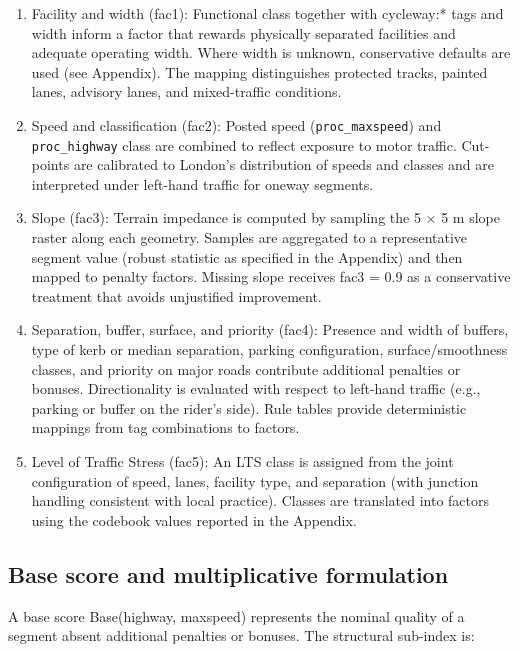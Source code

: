 \documentclass[
  12pt,
  oneside]{book}
\begin{document}
\begin{enumerate}
\def\labelenumi{\arabic{enumi}.}
\item
  Facility and width (fac1): Functional class together with cycleway:* tags and width inform a factor that rewards physically separated facilities and adequate operating width. Where width is unknown, conservative defaults are used (see Appendix). The mapping distinguishes protected tracks, painted lanes, advisory lanes, and mixed-traffic conditions.
\item
  Speed and classification (fac2): Posted speed (\texttt{proc\_maxspeed}) and \texttt{proc\_highway} class are combined to reflect exposure to motor traffic. Cut-points are calibrated to London's distribution of speeds and classes and are interpreted under left-hand traffic for oneway segments.
\item
  Slope (fac3): Terrain impedance is computed by sampling the 5 × 5 m slope raster along each geometry. Samples are aggregated to a representative segment value (robust statistic as specified in the Appendix) and then mapped to penalty factors. Missing slope receives fac3 = 0.9 as a conservative treatment that avoids unjustified improvement.
\item
  Separation, buffer, surface, and priority (fac4): Presence and width of buffers, type of kerb or median separation, parking configuration, surface/smoothness classes, and priority on major roads contribute additional penalties or bonuses. Directionality is evaluated with respect to left-hand traffic (e.g., parking or buffer on the rider's side). Rule tables provide deterministic mappings from tag combinations to factors.
\item
  Level of Traffic Stress (fac5): An LTS class is assigned from the joint configuration of speed, lanes, facility type, and separation (with junction handling consistent with local practice). Classes are translated into factors using the codebook values reported in the Appendix.
\end{enumerate}

\subsection{Base score and multiplicative formulation}\label{base-score-and-multiplicative-formulation}

A base score Base(highway, maxspeed) represents the nominal quality of a segment absent additional penalties or bonuses. The structural sub-index is:
\end{document}
